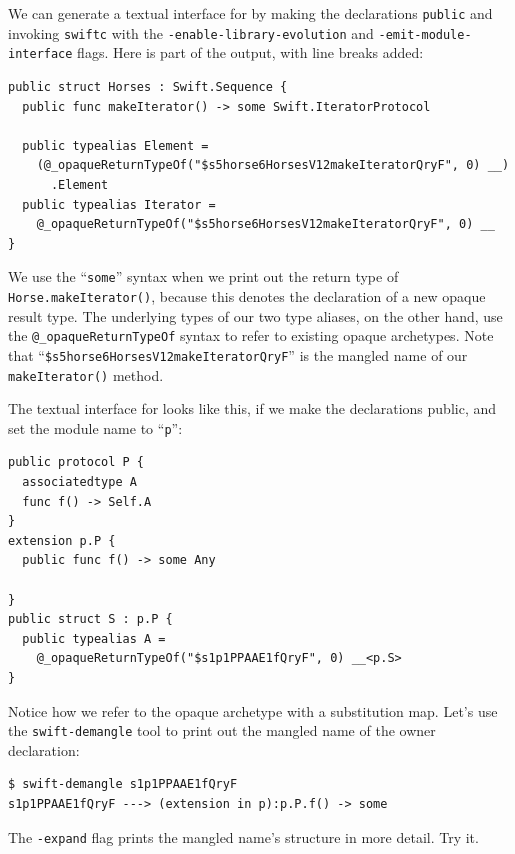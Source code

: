 \documentclass[../generics]{subfiles}
\begin{document}
\begin{example}
We can generate a textual interface for  by making the declarations \texttt{public} and invoking \texttt{swiftc} with the \texttt{-enable-library-evolution} and \texttt{-emit-module-interface} flags. Here is part of the output, with line breaks added:
\begin{Verbatim}
public struct Horses : Swift.Sequence {
  public func makeIterator() -> some Swift.IteratorProtocol

  public typealias Element =
    (@_opaqueReturnTypeOf("$s5horse6HorsesV12makeIteratorQryF", 0) __)
      .Element
  public typealias Iterator =
    @_opaqueReturnTypeOf("$s5horse6HorsesV12makeIteratorQryF", 0) __
}
\end{Verbatim}
We use the ``\texttt{some}'' syntax when we print out the return type of \texttt{Horse.makeIterator()}, because this denotes the declaration of a new opaque result type. The underlying types of our two type aliases, on the other hand, use the \verb|@_opaqueReturnTypeOf| syntax to refer to existing opaque archetypes. Note that ``\verb|$s5horse6HorsesV12makeIteratorQryF|'' is the mangled name of our \texttt{makeIterator()} method.
\end{example}

\begin{example}
The textual interface for  looks like this, if we make the declarations public, and set the module name to ``\texttt{p}'':
\begin{Verbatim}
public protocol P {
  associatedtype A
  func f() -> Self.A
}
extension p.P {
  public func f() -> some Any

}
public struct S : p.P {
  public typealias A =
    @_opaqueReturnTypeOf("$s1p1PPAAE1fQryF", 0) __<p.S>
}
\end{Verbatim}
Notice how we refer to the opaque archetype with a substitution map. Let's use the \texttt{swift-demangle} tool to print out the mangled name of the owner declaration:
\begin{Verbatim}
$ swift-demangle s1p1PPAAE1fQryF
s1p1PPAAE1fQryF ---> (extension in p):p.P.f() -> some
\end{Verbatim}
The \texttt{-expand} flag prints the mangled name's structure in more detail. Try it.
\end{example}
\end{document}
